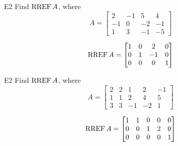\begin{problem}{E2}
Find \(\operatorname{RREF} A\), where
\[
  A =
  \begin{bmatrix}
    2 & -1 & 5 & 4 \\
    -1 & 0 & -2 & -1 \\
    1 & 3 & -1 & -5
  \end{bmatrix}
\]
\end{problem}
\begin{solution}
\[
  \operatorname{RREF} A =
  \begin{bmatrix}
    1 & 0 & 2 & 0 \\
    0 & 1 & -1 & 0 \\
    0 & 0 & 0 & 1
  \end{bmatrix}
\]
\end{solution}

\begin{problem}{E2}
Find \(\operatorname{RREF} A\), where
\[
  A =
  \begin{bmatrix}
    2 & 2 & 1 & 2 & -1 \\
    1 & 1 & 2 & 4 & 5 \\
    3 & 3 & -1 & -2 & 1
  \end{bmatrix}
\]
\end{problem}
\begin{solution}
\[
  \operatorname{RREF} A =
  \begin{bmatrix}
    1 & 1 & 0 & 0 & 0 \\
    0 & 0 & 1 & 2 & 0 \\
    0 & 0 & 0 & 0 & 1
  \end{bmatrix}
\]
\end{solution}
